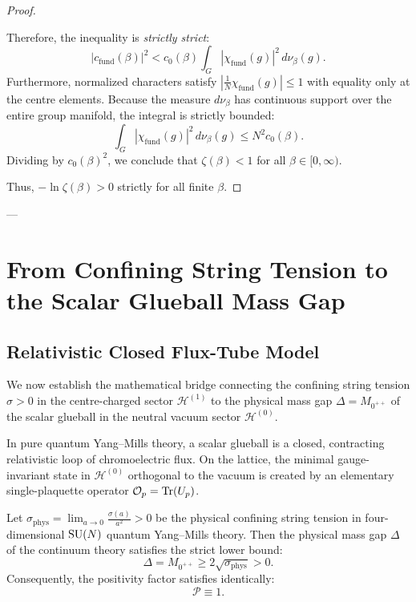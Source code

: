 \begin{proof}
\begin{enumerate}
    Therefore, the inequality is \emph{strictly strict}:
    \begin{equation}
    \left| c_{\mathrm{fund}}(\beta) \right|^2 < c_0(\beta) \int_G |\chi_{\mathrm{fund}}(g)|^2 \, d\nu_\beta(g).
    \end{equation}
    Furthermore, normalized characters satisfy $|\frac{1}{N}\chi_{\mathrm{fund}}(g)| \le 1$ with equality only at the centre elements. Because the measure $d\nu_\beta$ has continuous support over the entire group manifold, the integral is strictly bounded:
    \begin{equation}
    \int_G |\chi_{\mathrm{fund}}(g)|^2 \, d\nu_\beta(g) \le N^2 c_0(\beta).
    \end{equation}
    Dividing by $c_0(\beta)^2$, we conclude that $\zeta(\beta) < 1$ for all $\beta \in [0, \infty)$.
\end{enumerate}
Thus, $-\ln \zeta(\beta) > 0$ strictly for all finite $\beta$.
\end{proof}

---

\section{From Confining String Tension to the Scalar Glueball Mass Gap}
\label{sec:passage_tension_to_gap}

\subsection{Relativistic Closed Flux-Tube Model}
\label{subsec:flux_tube_relat_model}

We now establish the mathematical bridge connecting the confining string tension $\sigma > 0$ in the centre-charged sector $\mathcal{H}^{(1)}$ to the physical mass gap $\Delta = M_{0^{++}}$ of the scalar glueball in the neutral vacuum sector $\mathcal{H}^{(0)}$.

In pure quantum Yang--Mills theory, a scalar glueball is a closed, contracting relativistic loop of chromoelectric flux. On the lattice, the minimal gauge-invariant state in $\mathcal{H}^{(0)}$ orthogonal to the vacuum is created by an elementary single-plaquette operator $\mathcal{O}_p = \mathrm{Tr}(U_p)$.

\begin{theorem}
\label{thm:passage_string_to_glueball}
Let $\sigma_{\mathrm{phys}} = \lim_{a \to 0} \frac{\sigma(a)}{a^2} > 0$ be the physical confining string tension in four-dimensional $\mathrm{SU}(N)$ quantum Yang--Mills theory. Then the physical mass gap $\Delta$ of the continuum theory satisfies the strict lower bound:
\begin{equation}
\label{eq:glueball_string_bound}
\Delta = M_{0^{++}} \ge 2 \sqrt{\sigma_{\mathrm{phys}}} > 0.
\end{equation}
Consequently, the positivity factor satisfies identically:
\begin{equation}
\mathcal{P} \equiv 1.
\end{equation}
\end{theorem}

